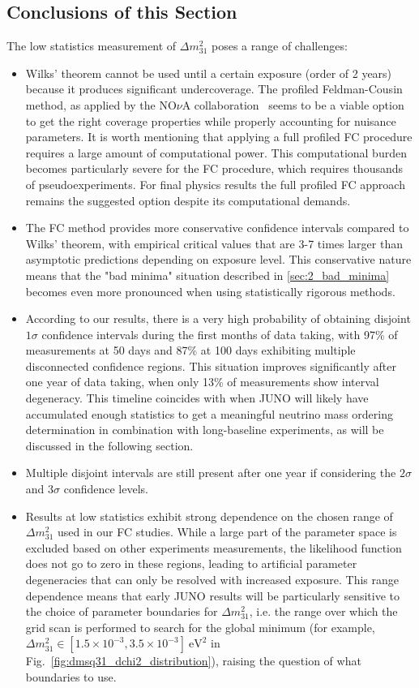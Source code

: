 \subsection{Conclusions of this Section}
The low statistics measurement of $\Delta m^2_{31}$ poses a range of challenges:
\begin{itemize}
    \item Wilks' theorem cannot be used until a certain exposure (order of 2 years) because it produces significant undercoverage. The profiled Feldman-Cousin method, as applied by the NO$\nu$A collaboration~\cite{NOvA:2022wnj} seems to be a viable option to get the right coverage properties while properly accounting for nuisance parameters. It is worth mentioning that applying a full profiled FC procedure requires a large amount of computational power.
    This computational burden becomes particularly severe for the FC procedure, which requires thousands of pseudoexperiments. For final physics results the full profiled FC approach remains the suggested option despite its computational demands.
    \item The FC method provides more conservative confidence intervals compared to Wilks' theorem, with empirical critical values that are 3-7 times larger than asymptotic predictions depending on exposure level. This conservative nature means that the "bad minima" situation described in \autoref{sec:2_bad_minima} becomes even more pronounced when using statistically rigorous methods.
    \item According to our results, there is a very high probability of obtaining disjoint $1\sigma$ confidence intervals during the first months of data taking, with 97\% of measurements at 50 days and 87\% at 100 days exhibiting multiple disconnected confidence regions. This situation improves significantly after one year of data taking, when only 13\% of measurements show interval degeneracy. This timeline coincides with when JUNO will likely have accumulated enough statistics to get a meaningful neutrino mass ordering determination in combination with long-baseline experiments, as will be discussed in the following section. 
    \item Multiple disjoint intervals are still present after one year if considering the $2\sigma$ and $3\sigma$ confidence levels.
    \item Results at low statistics exhibit strong dependence on the chosen range of $\Delta m_{31}^2$ used in our FC studies.  While a large part of the parameter space is excluded based on other experiments measurements, the likelihood function does not go to zero in these regions, leading to artificial parameter degeneracies that can only be resolved with increased exposure. This range dependence means that early JUNO results will be particularly sensitive to the choice of parameter boundaries for $\Delta m_{31}^2$, i.e. the range over which the grid scan is performed to search for the global minimum (for example, $\Delta m^2_{31} \in [1.5 \times 10^{-3},3.5 \times 10^{-3}]\mathrm{~eV}^2$ in Fig.~\ref{fig:dmsq31_dchi2_distribution}), raising the question of what boundaries to use.  

\end{itemize}

